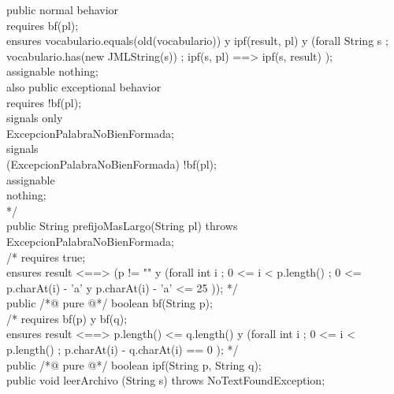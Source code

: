 \documentclass{article}
\begin{document}
{     public normal behavior\\
            requires 
                bf(pl);\\
            ensures 
                vocabulario.equals(old(vocabulario))
	         y
                ipf(result, pl)
		 y
		(forall String s ; vocabulario.has(new JMLString(s)) 
                                  ; ipf(s, pl) ==> ipf(s, result)
		);\\			
	    assignable 
                nothing;\\		
        also public exceptional behavior\\
            requires 
                !bf(pl);\\
            signals  only\\ 
                ExcepcionPalabraNoBienFormada;\\
            signals \\
                (ExcepcionPalabraNoBienFormada) !bf(pl);\\
	    assignable \\
                nothing;\\
      */		\\
    public String prefijoMasLargo(String pl) throws \\
        ExcepcionPalabraNoBienFormada;\\

	
    /* requires 
            true;\\
       ensures 
            result <==> (p != "" 
	                  y
			 (forall int i ; 0 <= i < p.length() 
			                ; 0 <= p.charAt(i) - 'a' 
			 		   y
					  p.charAt(i) - 'a' <= 25 
		         ));	
      */		\\		
    public /*@ pure @*/ boolean  bf(String p);\\
	

    /* requires 
            bf(p) y bf(q);\\
       ensures 
            result <==> p.length() <= q.length() 
	                  y
			 (forall int i ; 0 <= i < p.length() 
			         	; p.charAt(i) - q.charAt(i) 
                                           == 
                                          0
		         );
      */			\\			   
	public /*@ pure @*/ boolean  ipf(String p, String q);\\

    public void leerArchivo (String s) throws NoTextFoundException;\\
	
}
\end{document}
